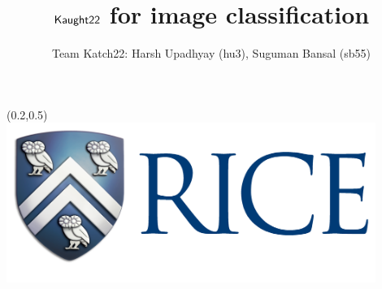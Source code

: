 \documentclass[20pt]{beamer}
\title{{\Huge \textsf{$\mathsf{Kaught22}$ for image classification}}} %
\author{{\huge \textsf{Team Katch22: Harsh Upadhyay (hu3), Suguman Bansal (sb55)}}}
\institute{{\huge \textsf{COMP540: Rice University}}}
\begin{document}
\begin{textblock}{16}(0.2,0.5)
\includegraphics[width=12cm]{Images/Rice_logo.png}
\end{textblock}

\setlength{\belowcaptionskip}{2ex} %
\setlength\belowdisplayshortskip{2ex} %
\end{document}
